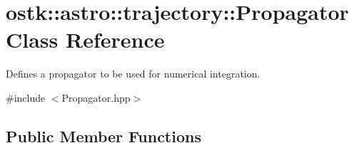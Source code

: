 \hypertarget{classostk_1_1astro_1_1trajectory_1_1_propagator}{}\section{ostk\+:\+:astro\+:\+:trajectory\+:\+:Propagator Class Reference}
\label{classostk_1_1astro_1_1trajectory_1_1_propagator}


Defines a propagator to be used for numerical integration.  




{\ttfamily \#include $<$Propagator.\+hpp$>$}

\subsection*{Public Member Functions}
